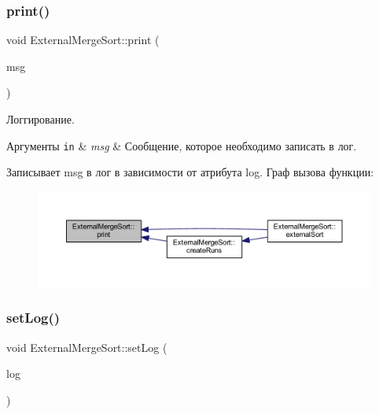 \subsubsection{\texorpdfstring{print()}{print()}}
{\footnotesize\ttfamily void External\+Merge\+Sort\+::print (\begin{DoxyParamCaption}\item[{const char $\ast$}]{msg }\end{DoxyParamCaption})\hspace{0.3cm}{\ttfamily [private]}}



Логгирование. 


\begin{DoxyParams}[1]{Аргументы}
\mbox{\tt in}  & {\em msg} & Сообщение, которое необходимо записать в лог.\\
\hline
\end{DoxyParams}
Записывает msg в лог в зависимости от атрибута log. Граф вызова функции\+:\nopagebreak
\begin{figure}[H]
\begin{center}
\leavevmode
\includegraphics[width=350pt]{class_external_merge_sort_a7a6b94fff35130ed6a498f9a31d0f863_icgraph}
\end{center}
\end{figure}
\hypertarget{class_external_merge_sort_ac0eeaba67ee0703acf73a8a5bf78ebe1}{}\label{class_external_merge_sort_ac0eeaba67ee0703acf73a8a5bf78ebe1} 
\subsubsection{\texorpdfstring{set\+Log()}{setLog()}}
{\footnotesize\ttfamily void External\+Merge\+Sort\+::set\+Log (\begin{DoxyParamCaption}\item[{\hyperlink{_structures_8h_af67907baa897e9fb84df0cb89795b87c}{Log\+Type}}]{log }\end{DoxyParamCaption})}



